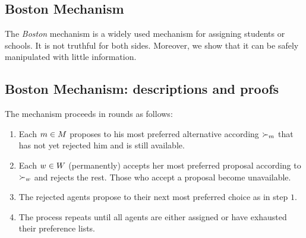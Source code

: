 \subsection{Boston Mechanism}
The \emph{Boston} mechanism \cite{abdulkadirouglu2003school} is a widely used mechanism for assigning students or schools. 
It is not truthful for both sides. Moreover, we show that it can be safely manipulated with little information.
\begin{toappendix}
\subsection{Boston Mechanism: descriptions and proofs}
The mechanism proceeds in rounds as follows:
\begin{enumerate}
    \item Each $m \in M$ proposes to his most preferred alternative according $\succ_{m}$ that has not yet rejected him and is still available.

    \item Each $w \in W$ (permanently) accepts her most preferred proposal according to $\succ_{w}$ and rejects the rest. Those who accept a proposal become unavailable. 

    \item The rejected agents propose to their next most preferred choice as in step $1$.

    \item The process repeats until all agents are either assigned or have exhausted their preference lists.
\end{enumerate}

\end{toappendix}


